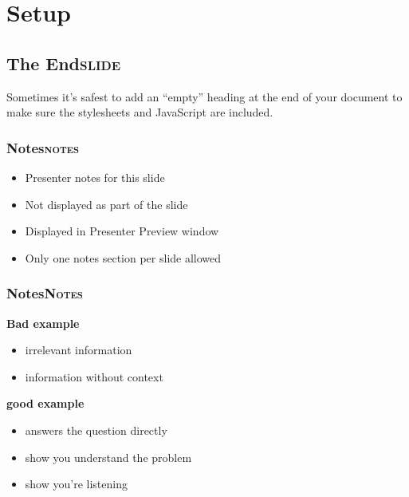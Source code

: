 \documentclass[12pt]{article}
\begin{document}
\section{Setup}
\label{sec:org5914d9e}


\subsection[The End]{The End\hfill{}\textsc{slide}}
\label{sec:orge3f8110}

Sometimes it's safest to add an ``empty'' heading at the end of your document to make sure the stylesheets and JavaScript are included.


\subsubsection[Notes]{Notes\hfill{}\textsc{notes}}
\label{sec:org59b411f}

\begin{itemize}
\item Presenter notes for this slide
\item Not displayed as part of the slide
\item Displayed in Presenter Preview window
\item Only one notes section per slide allowed
\end{itemize}

\subsubsection[Notes]{Notes\hfill{}\textsc{Notes}}
\label{sec:org585b5d8}

\textbf{Bad example}
\begin{itemize}
\item irrelevant information
\item information without context
\end{itemize}

\textbf{good example}
\begin{itemize}
\item answers the question directly
\item show you understand the problem
\item show you're listening
\end{itemize}
\end{document}
